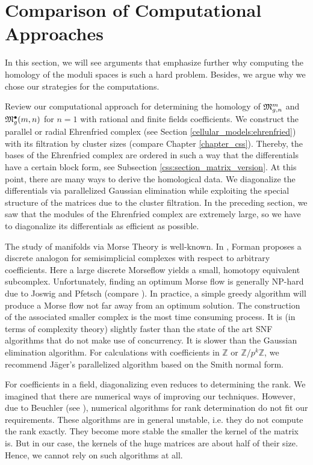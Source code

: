 \section{Comparison of Computational Approaches}

In this section, we will see arguments that emphasize further why computing the homology of the moduli spaces is such a hard problem.
Besides, we argue why we chose our strategies for the computations.

Review our computational approach for determining the homology of $\mathfrak{M}^m_{g,n}$ and $\mathfrak{M}^\bullet_g(m, n)$ for $n = 1$ with rational and finite fields coefficients.
We construct the parallel or radial Ehrenfried complex (see Section \ref{cellular_models:ehrenfried}) with its filtration by cluster sizes (compare Chapter \ref{chapter_css}).
Thereby, the bases of the Ehrenfried complex are ordered in such a way that the differentials have a certain block form, see Subsection \ref{css:section_matrix_version}.
At this point, there are many ways to derive the homological data.
We diagonalize the differentials via parallelized Gaussian elimination while exploiting the special structure of the matrices due to the cluster filtration.
In the preceding section, we saw that the modules of the Ehrenfried complex are extremely large, so we have to diagonalize its differentials as efficient as possible.

The study of manifolds via Morse Theory is well-known.
In \cite{Forman2002}, Forman proposes a discrete analogon for semisimplicial complexes with respect to arbitrary coefficients.
Here a large discrete Morseflow yields a small, homotopy equivalent subcomplex.
Unfortunately, finding an optimum Morse flow is generally NP-hard due to Joswig and Pfetsch (compare \cite{JoswigPfetsch2006}).
In practice, a simple greedy algorithm will produce a Morse flow not far away from an optimum solution.
The construction of the associated smaller complex is the most time consuming process.
It is (in terms of complexity theory) slightly faster than the state of the art SNF algorithms that do not make use of concurrency.
It is slower than the Gaussian elimination algorithm.
For calculations with coefficients in $\mathbb Z$ or $\mathbb Z / p^k \mathbb Z$, we recommend Jäger's parallelized algorithm based on the Smith normal form.

For coefficients in a field, diagonalizing even reduces to determining the rank.
We imagined that there are numerical ways of improving our techniques.
However, due to Beuchler (see \cite{Beuchler201402}), numerical algorithms for rank determination do not fit our requirements.
These algorithms are in general unstable, i.e. they do not compute the rank exactly.
They become more stable the smaller the kernel of the matrix is.
But in our case, the kernels of the huge matrices are about half of their size.
Hence, we cannot rely on such algorithms at all.

